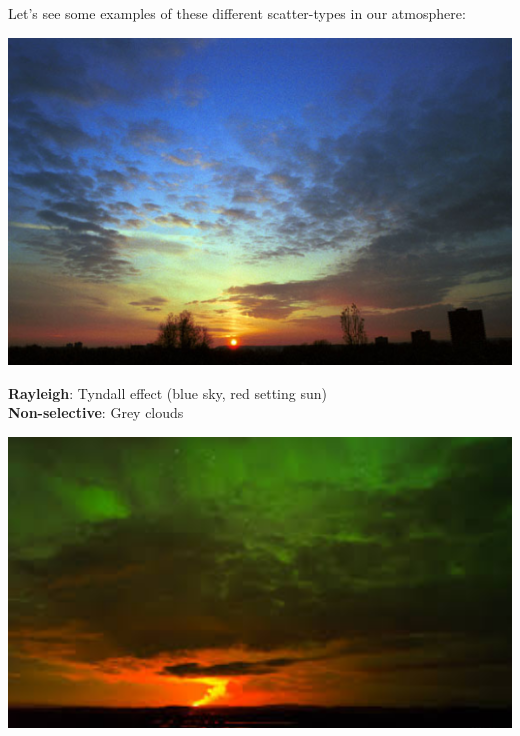 \documentclass[a4paper, fontsize=8pt, landscape, DIV=1]{scrartcl}
\begin{document}
\begin{multicols*}{4}
	 	Let's see some examples of these different scatter-types in our atmosphere:\\ 
	 	\begin{minipage}[t]{0.49\columnwidth}
	 		\begin{flushleft}
	 			\includegraphics[width=\columnwidth]{images/Introduction/ex_ray_non.png}\\
	 		\end{flushleft}
	 	\end{minipage}
	 	\begin{minipage}[b]{0.49\columnwidth}
	 		\begin{flushleft}
	 			\textbf{Rayleigh}: Tyndall effect (blue sky, red setting sun)\\
	 			\textbf{Non-selective}: Grey clouds
	 		\end{flushleft}
	 	\end{minipage}
 		\par 
 		\begin{minipage}[t]{0.49\columnwidth}
 			\begin{flushleft}
 				\includegraphics[width=\columnwidth]{images/Introduction/ex_mie.png}\\

\end{flushleft}
\end{minipage}
\end{multicols*}
\end{document}
